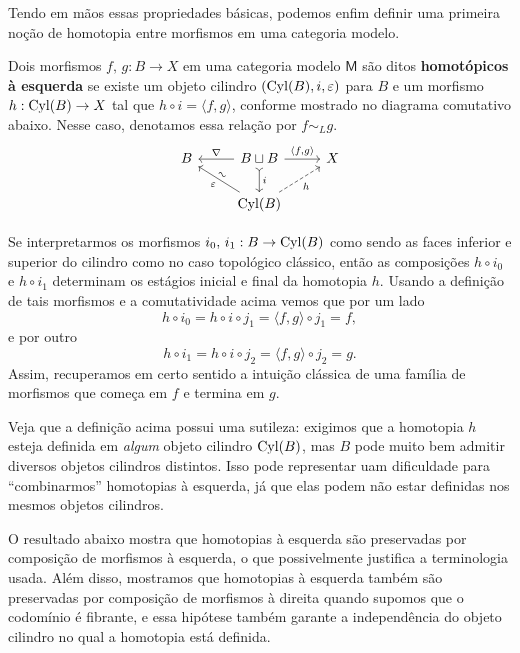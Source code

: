 Tendo em mãos essas propriedades básicas, podemos enfim definir uma primeira noção de homotopia entre morfismos em uma categoria modelo.

\begin{defin}
  Dois morfismos $f,\,g: B \to X$ em uma categoria modelo $\mathsf{M}$ são ditos \textbf{homotópicos à esquerda} se existe um objeto cilindro $(\mathrm{Cyl}(B),i,\varepsilon)$ para $B$ e um morfismo $h: \mathrm{Cyl}(B) \to X$ tal que $h \circ i = \langle f,g \rangle$, conforme mostrado no diagrama comutativo abaixo.
  Nesse caso, denotamos essa relação por $f \sim_{L} g$.
  \begin{displaymath}
    \begin{tikzcd}
      B
      & B \sqcup B
      \arrow[l, "\nabla" swap]
      \arrow[r, "{\langle f,g \rangle}"]
      \arrow[d, tail, "i"]
      & X
      \\ & \Cyl(B)
      \arrow[ru, dashed, "h" swap]
      \arrow[lu, "\varepsilon", "\sim" {sloped}]
    \end{tikzcd}
  \end{displaymath}
\end{defin}

Se interpretarmos os morfismos $i_{0},\, i_{1}: B \to \mathrm{Cyl}(B)$ como sendo as faces inferior e superior do cilindro como no caso topológico clássico, então as composições $h \circ i_{0}$ e $h \circ i_{1}$ determinam os estágios inicial e final da homotopia $h$.
Usando a definição de tais morfismos e a comutatividade acima vemos que por um lado
\begin{displaymath}
  h \circ i_{0} = h \circ i \circ j_{1} = \langle f,g \rangle \circ j_{1} = f,
\end{displaymath}
e por outro
\begin{displaymath}
  h \circ i_{1} = h \circ i \circ j_{2} = \langle f,g \rangle \circ j_{2} = g.
\end{displaymath}
Assim, recuperamos em certo sentido a intuição clássica de uma família de morfismos que começa em $f$ e termina em $g$.

Veja que a definição acima possui uma sutileza: exigimos que a homotopia $h$ esteja definida em \emph{algum} objeto cilindro $\mathrm{Cyl}(B)$, mas $B$ pode muito bem admitir diversos objetos cilindros distintos.
Isso pode representar uam dificuldade para ``combinarmos'' homotopias à esquerda, já que elas podem não estar definidas nos mesmos objetos cilindros.

O resultado abaixo mostra que homotopias à esquerda são preservadas por composição de morfismos à esquerda, o que possivelmente justifica a terminologia usada.
Além disso, mostramos que homotopias à esquerda também são preservadas por composição de morfismos à direita quando supomos que o codomínio é fibrante, e essa hipótese também garante a independência do objeto cilindro no qual a homotopia está definida.

